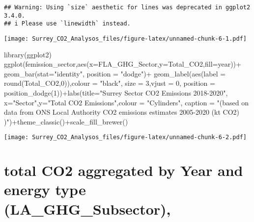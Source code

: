 \documentclass[
]{article}
\newenvironment{Shaded}{\begin{snugshade}}{\end{snugshade}}
\newcommand{\AttributeTok}[1]{\textcolor[rgb]{0.77,0.63,0.00}{#1}}
\newcommand{\DecValTok}[1]{\textcolor[rgb]{0.00,0.00,0.81}{#1}}
\newcommand{\FunctionTok}[1]{\textcolor[rgb]{0.00,0.00,0.00}{#1}}
\newcommand{\NormalTok}[1]{#1}
\newcommand{\SpecialCharTok}[1]{\textcolor[rgb]{0.00,0.00,0.00}{#1}}
\newcommand{\StringTok}[1]{\textcolor[rgb]{0.31,0.60,0.02}{#1}}
\begin{document}
\begin{verbatim}
## Warning: Using `size` aesthetic for lines was deprecated in ggplot2 3.4.0.
## i Please use `linewidth` instead.
\end{verbatim}

\texttt{[image: Surrey\_CO2\_Analysos\_files/figure-latex/unnamed-chunk-6-1.pdf]}

\begin{Shaded}
\begin{Highlighting}[]
\FunctionTok{library}\NormalTok{(ggplot2)}
\FunctionTok{ggplot}\NormalTok{(femission\_sector,}\FunctionTok{aes}\NormalTok{(}\AttributeTok{x=}\NormalTok{FLA\_GHG\_Sector,}\AttributeTok{y=}\NormalTok{Total\_CO2,}\AttributeTok{fill=}\NormalTok{year))}\SpecialCharTok{+}
   \FunctionTok{geom\_bar}\NormalTok{(}\AttributeTok{stat=}\StringTok{"identity"}\NormalTok{, }\AttributeTok{position =} \StringTok{"dodge"}\NormalTok{)}\SpecialCharTok{+}  
  \FunctionTok{geom\_label}\NormalTok{(}\FunctionTok{aes}\NormalTok{(}\AttributeTok{label =} \FunctionTok{round}\NormalTok{(Total\_CO2,}\DecValTok{0}\NormalTok{)),}\AttributeTok{colour =} \StringTok{"black"}\NormalTok{, }\AttributeTok{size =} \DecValTok{3}\NormalTok{,}\AttributeTok{vjust =} \DecValTok{0}\NormalTok{, }\AttributeTok{position =} \FunctionTok{position\_dodge}\NormalTok{(}\DecValTok{1}\NormalTok{))}\SpecialCharTok{+}\FunctionTok{labs}\NormalTok{(}\AttributeTok{title=}\StringTok{"Surrey Sector CO2 Emissions 2018{-}2020"}\NormalTok{, }\AttributeTok{x=}\StringTok{"Sector"}\NormalTok{,}\AttributeTok{y=}\StringTok{"Total CO2 Emissions"}\NormalTok{,}\AttributeTok{colour =} \StringTok{"Cylinders"}\NormalTok{, }\AttributeTok{caption =} \StringTok{"(based on data from  ONS Local Authority CO2 emissions estimates 2005{-}2020 (kt CO2) )"}\NormalTok{)}\SpecialCharTok{+}\FunctionTok{theme\_classic}\NormalTok{()}\SpecialCharTok{+}\FunctionTok{scale\_fill\_brewer}\NormalTok{()}
\end{Highlighting}
\end{Shaded}

\texttt{[image: Surrey\_CO2\_Analysos\_files/figure-latex/unnamed-chunk-6-2.pdf]}

\hypertarget{total-co2-aggregated-by-year-and-energy-type-la_ghg_subsector}{%
\section{total CO2 aggregated by Year and energy type
(LA\_GHG\_Subsector),}\label{total-co2-aggregated-by-year-and-energy-type-la_ghg_subsector}}
\end{document}
